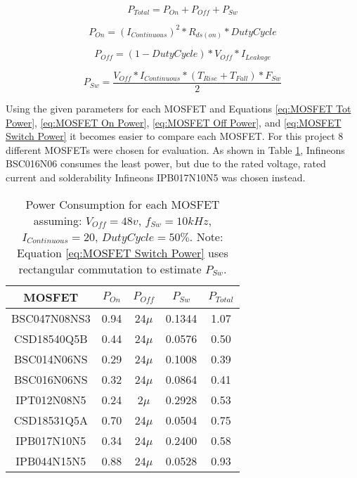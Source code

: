 \documentclass{article}
\begin{document}
			\begin{equation}
				\label{eq:MOSFET Tot Power}
				P_{Total} = P_{On} + P_{Off} + P_{Sw}
			\end{equation}
			
			\begin{equation}
				\label{eq:MOSFET On Power}
				P_{On} = (I_{Continuous})^2 * R_{ds(on)} * DutyCycle
			\end{equation}
			
			\begin{equation}
				\label{eq:MOSFET Off Power}
				P_{Off} = (1 - DutyCycle) * V_{Off} * I_{Leakage}
			\end{equation}
			
			\begin{equation}
				\label{eq:MOSFET Switch Power}
				P_{Sw} = \frac{V_{Off} * I_{Continuous} * (T_{Rise} + T_{Fall}) * F_{Sw}}{2}
			\end{equation}
	
		\noindent Using the given parameters for each MOSFET and Equations \ref{eq:MOSFET Tot Power}, \ref{eq:MOSFET On Power}, \ref{eq:MOSFET Off Power}, and \ref{eq:MOSFET Switch Power} it becomes easier to compare each MOSFET.  For this project 8 different MOSFETs were chosen for evaluation.  As shown in Table \ref{tab:MOSFET Power}, Infineons BSC016N06 consumes the least power, but due to the rated voltage, rated current and solderability Infineons IPB017N10N5 was chosen instead.
		
		\begin{table}[!ht]
			\begin{center}
				\label{tab:MOSFET Power}
				\begin{tabular}{ |c|c|c|c|c| }
					\hline
					MOSFET & $P_{On}$ & $P_{Off}$ & $P_{Sw}$ & $P_{Total}$ \\
					\hline \hline
					BSC047N08NS3 & 0.94 & 24$\mu$ & 0.1344 & 1.07 \\
					\hline
					CSD18540Q5B & 0.44 & 24$\mu$ & 0.0576 & 0.50 \\
					\hline
					BSC014N06NS & 0.29 & 24$\mu$ & 0.1008 & 0.39 \\
					\hline
					BSC016N06NS & 0.32 & 24$\mu$ & 0.0864 & 0.41 \\
					\hline
					IPT012N08N5 & 0.24 & 2$\mu$ & 0.2928 & 0.53 \\
					\hline
					CSD18531Q5A & 0.70 & 24$\mu$ & 0.0504 & 0.75 \\
					\hline
					IPB017N10N5 & 0.34 & 24$\mu$ & 0.2400 & 0.58 \\
					\hline
					IPB044N15N5 & 0.88 & 24$\mu$ & 0.0528 & 0.93 \\
					\hline
				\end{tabular}
				\caption{Power Consumption for each MOSFET assuming: $V_{Off}=48v$, $f_{Sw}=10kHz$, $I_{Continuous}=20$, $DutyCycle=50\%$.  Note: Equation \ref{eq:MOSFET Switch Power} uses rectangular commutation to estimate $P_{Sw}$.}
			\end{center}
		\end{table}
	
\end{document}
